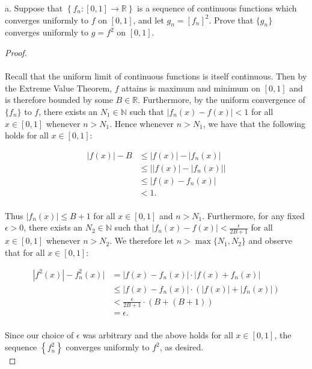 a.  Suppose that $\left\{f_n:[0,1] \to \mathbb{R}\right\}$ is a sequence of
    continuous functions which converges uniformly to $f$ on $[0, 1]$, and let
    $g_n = [f_n]^2$. Prove that $\{g_n\}$ converges uniformly to 
    $g = f^2$ on $[0, 1]$.\ \\

    \begin{proof}\ \\\\
        Recall that the uniform limit of continuous functions is itself continuous. Then by the Extreme Value Theorem,
        $f$ attains is maximum and minimum on $[0, 1]$ and is therefore bounded by some $B \in \mathbb{R}$. Furthermore,
        by the uniform convergence of $\{f_n\}$ to $f$, there exists an $N_1 \in \mathbb{N}$ such that 
        $|f_n(x) - f(x)| < 1$ for all $x \in [0, 1]$ whenever $n > N_1$. Hence whenever $n > N_1$, we have that the 
        following holds for all $x \in [0, 1]$:

        \begin{align*}
            |f(x)| - B &\le |f(x)| - |f_n(x)| \\
                       &\le \big| |f(x)| - |f_n(x)| \big| \\
                       &\le |f(x) - f_n(x)| \\
                       &< 1. \\
        \end{align*}
        
        Thus $|f_n(x)| \le B + 1$ for all $x \in [0, 1]$ and $n > N_1$.
        Furthermore, for any fixed $\epsilon > 0$, there exists an $N_2 \in \mathbb{N}$ such that 
        $|f_n(x) - f(x)| < \frac{\epsilon}{2B + 1}$ for all $x \in [0, 1]$ whenever $n > N_2$. We therefore let 
        $n > \max{\{N_1, N_2\}}$ and observe that for all $x \in [0, 1]$:

        \begin{align*}
            |f^2(x)| - f_n^2(x)| &= |f(x) - f_n(x)| \cdot |f(x) + f_n(x)| \\
                                 &\le |f(x) - f_n(x)| \cdot \left(|f(x)| + |f_n(x)|\right) \\
                                 &< \frac{\epsilon}{2B + 1} \cdot \left(B + (B+1)\right) \\
                                 &= \epsilon. \\
        \end{align*}

        Since our choice of $\epsilon$ was arbitrary and the above holds for all $x \in [0, 1]$, the sequence 
        $\left\{f_n^2\right\}$ converges uniformly to $f^2$, as desired.
        \ \\
    \end{proof}

